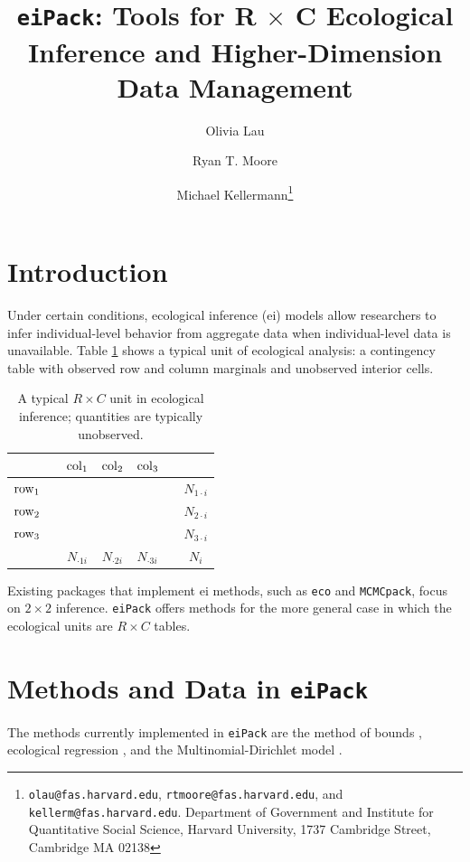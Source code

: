 \documentclass[12pt]{article}
\title{\texttt{eiPack}: Tools for R $\times$ C Ecological
Inference and Higher-Dimension Data Management}
\author{Olivia Lau \and Ryan T. Moore \and Michael
Kellermann\footnote{\texttt{olau@fas.harvard.edu},
\texttt{rtmoore@fas.harvard.edu}, and
\texttt{kellerm@fas.harvard.edu}.  Department of Government and Institute for Quantitative Social Science, Harvard University, 1737
Cambridge Street, Cambridge MA 02138}}
\begin{document}
\maketitle

\section{Introduction}

Under certain conditions, ecological inference ({\sc ei}) models allow
researchers to infer individual-level behavior from aggregate data
when individual-level data is unavailable.  Table \ref{t:ei} shows a
typical unit of ecological analysis: a contingency table with observed
row and column marginals and unobserved interior cells.

\begin{table}[h!]
\begin{center}
\begin{tabular}{l|ccc|c}
	& $\rm{col}_1$ & $\rm{col}_2$ & $\rm{col}_3$ & \\
\hline
$\rm{row}_1\quad$	& \color{DarkRed2}{$\quad N_{11i}\quad$} &
\color{DarkRed2}{$\quad N_{12i}\quad$} &
\color{DarkRed2}{$\quad N_{13i}\quad$} & $\quad N_{1\cdot i}$ \\
$\rm{row}_2\quad$ 	& \color{DarkRed2}{$N_{21i}$} & \color{DarkRed2}{$N_{22i}$} &
\color{DarkRed2}{$N_{23i}$} & $\quad N_{2\cdot i}$ \\ 
$\rm{row}_3\quad$	& \color{DarkRed2}{$N_{31i}$} & \color{DarkRed2}{$N_{32i}$} &
\color{DarkRed2}{$N_{33i}$} & $\quad N_{3\cdot i}$ \\ 
\hline
	& $N_{\cdot 1i}$ & $N_{\cdot 2i}$ & $N_{\cdot 3i}$ & $\quad N_i$
\end{tabular} 
\end{center}
\caption{A typical $R \times C$ unit in ecological inference;
\color{DarkRed2}{red} quantities are typically unobserved.}
\label{t:ei}
\end{table}

Existing packages that implement {\sc ei} methods, such as
\texttt{eco} and \texttt{MCMCpack}, focus on $2 \times 2$
inference. \texttt{eiPack} offers methods for the more general case in
which the ecological units are $R \times C$ tables.  

\section{Methods and Data in \texttt{eiPack}}

The methods currently implemented in \texttt{eiPack} are the method of
bounds \citep{DunDav53}, ecological regression \citep{Goodman53}, and
the Multinomial-Dirichlet model \citep{RosJiaKin01}.
\end{document}
